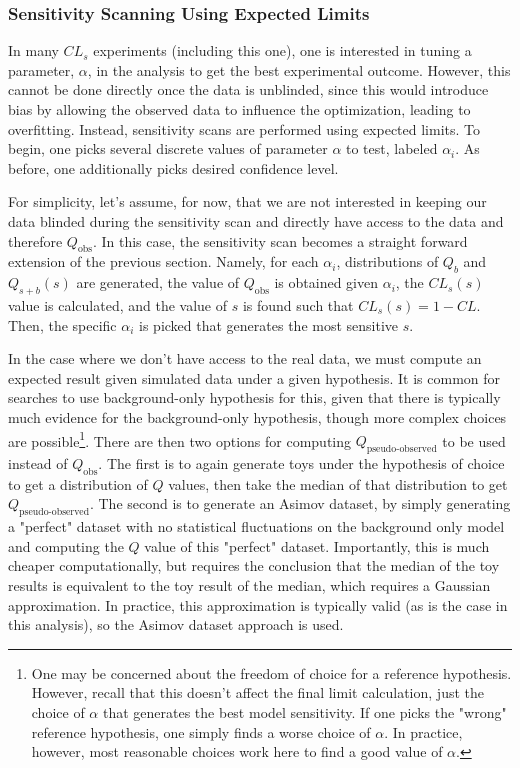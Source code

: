 \subsubsection{Sensitivity Scanning Using Expected Limits}
\label{subsubsec:sensitivity_scanning_limits}

In many $CL_s$ experiments (including this one), one is interested in tuning a parameter, $\alpha$, in the analysis to get the best experimental outcome. However, this cannot be done directly once the data is unblinded, since this would introduce bias by allowing the observed data to influence the optimization, leading to overfitting. Instead, sensitivity scans are performed using expected limits. To begin, one picks several discrete values of parameter $\alpha$ to test, labeled $\alpha_i$. As before, one additionally picks desired confidence level.

For simplicity, let's assume, for now, that we are not interested in keeping our data blinded during the sensitivity scan and directly have access to the data and therefore $Q_{\text{obs}}$. In this case, the sensitivity scan becomes a straight forward extension of the previous section. Namely, for each $\alpha_i$, distributions of $Q_b$ and $Q_{s+b}(s)$ are generated, the value of $Q_{\text{obs}}$ is obtained given $\alpha_i$, the $CL_s(s)$ value is calculated, and the value of $s$ is found such that $CL_s(s) = 1-CL$. Then, the specific $\alpha_i$ is picked that generates the most sensitive $s$. 

In the case where we don't have access to the real data, we must compute an expected result given simulated data under a given hypothesis. It is common for searches to use background-only hypothesis for this, given that there is typically much evidence for the background-only hypothesis, though more complex choices are possible\footnote{One may be concerned about the freedom of choice for a reference hypothesis. However, recall that this doesn't affect the final limit calculation, just the choice of $\alpha$ that generates the best model sensitivity. If one picks the "wrong" reference hypothesis, one simply finds a worse choice of $\alpha$. In practice, however, most reasonable choices work here to find a good value of $\alpha$.}. There are then two options for computing $Q_{\text{pseudo-observed}}$ to be used instead of $Q_{\text{obs}}$. The first is to again generate toys under the hypothesis of choice to get a distribution of $Q$ values, then take the median of that distribution to get $Q_{\text{pseudo-observed}}$. The second is to generate an Asimov dataset, by simply generating a "perfect" dataset with no statistical fluctuations on the background only model and computing the $Q$ value of this "perfect" dataset. Importantly, this is much cheaper computationally, but requires the conclusion that the median of the toy results is equivalent to the toy result of the median, which requires a Gaussian approximation. In practice, this approximation is typically valid (as is the case in this analysis), so the Asimov dataset approach is used.

